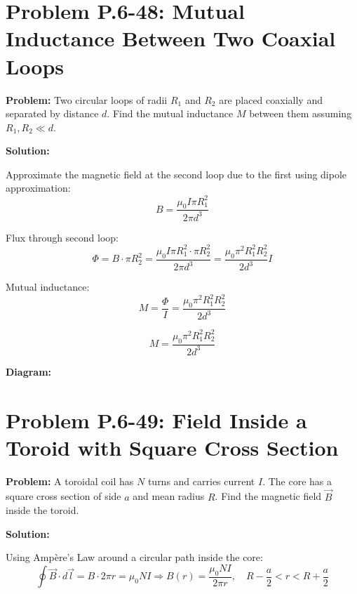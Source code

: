 \documentclass[12pt]{article}
\begin{document}
\section*{Problem P.6-48: Mutual Inductance Between Two Coaxial Loops}

\textbf{Problem:}  
Two circular loops of radii \( R_1 \) and \( R_2 \) are placed coaxially and separated by distance \( d \). Find the mutual inductance \( M \) between them assuming \( R_1, R_2 \ll d \).

\textbf{Solution:}

Approximate the magnetic field at the second loop due to the first using dipole approximation:
\[
B = \frac{\mu_0 I \pi R_1^2}{2\pi d^3}
\]

Flux through second loop:
\[
\Phi = B \cdot \pi R_2^2 = \frac{\mu_0 I \pi R_1^2 \cdot \pi R_2^2}{2\pi d^3}
= \frac{\mu_0 \pi^2 R_1^2 R_2^2}{2 d^3} I
\]

Mutual inductance:
\[
M = \frac{\Phi}{I} = \frac{\mu_0 \pi^2 R_1^2 R_2^2}{2 d^3}
\]

\begin{tcolorbox}
\[
\boxed{M = \frac{\mu_0 \pi^2 R_1^2 R_2^2}{2 d^3}}
\]
\end{tcolorbox}

\textbf{Diagram:}
\begin{center}
\end{center}



\section*{Problem P.6-49: Field Inside a Toroid with Square Cross Section}

\textbf{Problem:}  
A toroidal coil has \( N \) turns and carries current \( I \). The core has a square cross section of side \( a \) and mean radius \( R \). Find the magnetic field \( \vec{B} \) inside the toroid.

\textbf{Solution:}

Using Ampère’s Law around a circular path inside the core:
\[
\oint \vec{B} \cdot d\vec{l} = B \cdot 2\pi r = \mu_0 N I
\Rightarrow B(r) = \frac{\mu_0 N I}{2\pi r}, \quad R - \frac{a}{2} < r < R + \frac{a}{2}
\]
\end{document}
